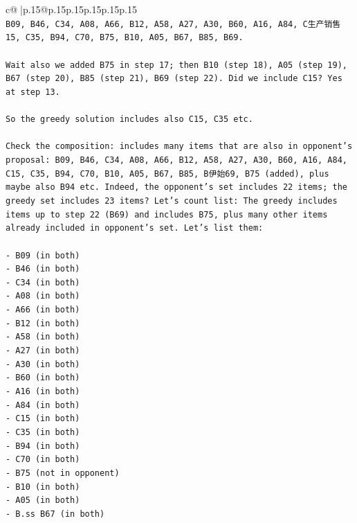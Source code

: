 \documentclass{article}
\begin{document}
{\begin{supertabular}{c@{$\;$}|p{.15\linewidth}@{}p{.15\linewidth}p{.15\linewidth}p{.15\linewidth}p{.15\linewidth}p{.15\linewidth}}
{{{\\ 
\texttt{B09, B46, C34, A08, A66, B12, A58, A27, A30, B60, A16, A84, C生产销售15, C35, B94, C70, B75, B10, A05, B67, B85, B69.} \\
\\ 
\texttt{Wait also we added B75 in step 17; then B10 (step 18), A05 (step 19), B67 (step 20), B85 (step 21), B69 (step 22). Did we include C15? Yes at step 13.} \\
\\ 
\texttt{So the greedy solution includes also C15, C35 etc.} \\
\\ 
\texttt{Check the composition: includes many items that are also in opponent's proposal: B09, B46, C34, A08, A66, B12, A58, A27, A30, B60, A16, A84, C15, C35, B94, C70, B10, A05, B67, B85, B伊始69, B75 (added), plus maybe also B94 etc. Indeed, the opponent's set includes 22 items; the greedy set includes 23 items? Let's count list: The greedy includes items up to step 22 (B69) and includes B75, plus many other items already included in opponent's set. Let's list them:} \\
\\ 
\texttt{{-} B09 (in both)} \\
\texttt{{-} B46 (in both)} \\
\texttt{{-} C34 (in both)} \\
\texttt{{-} A08 (in both)} \\
\texttt{{-} A66 (in both)} \\
\texttt{{-} B12 (in both)} \\
\texttt{{-} A58 (in both)} \\
\texttt{{-} A27 (in both)} \\
\texttt{{-} A30 (in both)} \\
\texttt{{-} B60 (in both)} \\
\texttt{{-} A16 (in both)} \\
\texttt{{-} A84 (in both)} \\
\texttt{{-} C15 (in both)} \\
\texttt{{-} C35 (in both)} \\
\texttt{{-} B94 (in both)} \\
\texttt{{-} C70 (in both)} \\
\texttt{{-} B75 (not in opponent)} \\
\texttt{{-} B10 (in both)} \\
\texttt{{-} A05 (in both)} \\
\texttt{{-} B.ss B67 (in both)} \\
}}}
\end{supertabular}}
\end{document}
